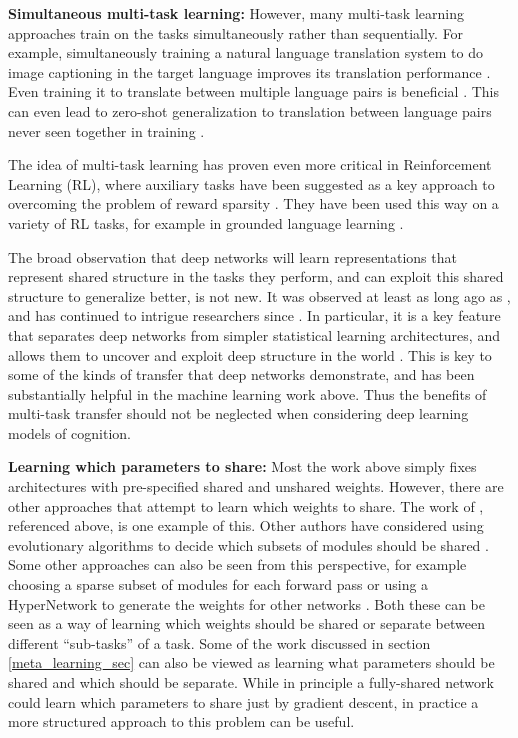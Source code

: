 \textbf{Simultaneous multi-task learning:} However, many multi-task learning approaches train on the tasks simultaneously rather than sequentially. For example, simultaneously training a natural language translation system to do image captioning in the target language improves its translation performance \citep{Luong2016}. Even training it to translate between multiple language pairs is beneficial \citep{Dong2015}. This can even lead to zero-shot generalization to translation between language pairs never seen together in training \citep{Johnson2016a}. \par 
The idea of multi-task learning has proven even more critical in Reinforcement Learning (RL), where auxiliary tasks have been suggested as a key approach to overcoming the problem of reward sparsity \citep[e.g.][]{LeCun2016}. They have been used this way on a variety of RL tasks, for example in grounded language learning \citep{Hermann2017}. \par
The broad observation that deep networks will learn representations that represent shared structure in the tasks they perform, and can exploit this shared structure to generalize better, is not new. It was observed at least as long ago as \citet{Hinton1986}, and has continued to intrigue researchers since \citep[e.g.][]{Lampinen2017a}. In particular, it is a key feature that separates deep networks from simpler statistical learning architectures, and allows them to uncover and exploit deep structure in the world \citep{Rogers2008}. This is key to some of the kinds of transfer that deep networks demonstrate, and has been substantially helpful in the machine learning work above. Thus the benefits of multi-task transfer should not be neglected when considering deep learning models of cognition. \par 

\textbf{Learning which parameters to share:} Most the work above simply fixes architectures with pre-specified shared and unshared weights. However, there are other approaches that attempt to learn which weights to share. The work of \citet{Achille2018a}, referenced above, is one example of this.  Other authors have considered using evolutionary algorithms to decide which subsets of modules should be shared \citep{Fernando2017}. Some other approaches can also be seen from this perspective, for example choosing a sparse subset of modules for each forward pass \citep{Shazeer2017} or using a HyperNetwork to generate the weights for other networks \citep{Ha2016}. Both these can be seen as a way of learning which weights should be shared or separate between different ``sub-tasks'' of a task. Some of the work discussed in section \ref{meta_learning_sec} can also be viewed as learning what parameters should be shared and which should be separate. While in principle a fully-shared network could learn which parameters to share just by gradient descent, in practice a more structured approach to this problem can be useful. \par 

